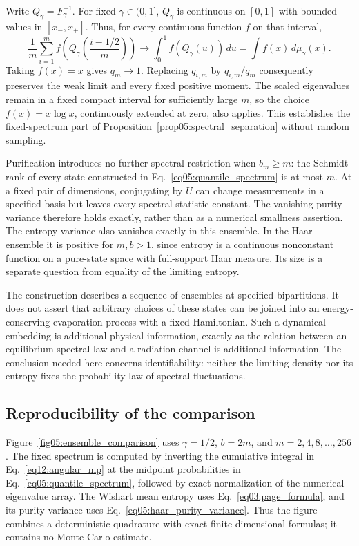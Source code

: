 \documentclass[11pt,letterpaper]{article}
\theoremstyle{plain}
\theoremstyle{definition}
\theoremstyle{remark}
\begin{document}
Write $Q_\gamma=F_\gamma^{-1}$.  For fixed $\gamma\in(0,1]$,
$Q_\gamma$ is continuous on $[0,1]$ with bounded values in
$[x_-,x_+]$.  Thus, for every continuous function $f$ on that interval,
\begin{equation}
\label{eq12:quantile_riemann}
 \frac1m\sum_{i=1}^m
 f\!\left(Q_\gamma\!\left(\frac{i-1/2}{m}\right)\right)
 \longrightarrow
 \int_0^1 f(Q_\gamma(u))\,du
 =\int f(x)\,d\mu_\gamma(x).
\end{equation}
Taking $f(x)=x$ gives $\bar q_m\to1$.  Replacing $q_{i,m}$ by
$q_{i,m}/\bar q_m$ consequently preserves the weak limit and every
fixed positive moment.  The scaled eigenvalues remain in a fixed
compact interval for sufficiently large $m$, so the choice
$f(x)=x\log x$, continuously extended at zero, also applies.  This
establishes the fixed-spectrum part of
Proposition~\ref{prop05:spectral_separation} without random sampling.

Purification introduces no further spectral restriction when $b_m\geq
m$: the Schmidt rank of every state constructed in
Eq.~\eqref{eq05:quantile_spectrum} is at most $m$.  At a fixed pair of
dimensions, conjugating by $U$ can change measurements in a specified
basis but leaves every spectral statistic constant.  The vanishing
purity variance therefore holds exactly, rather than as a numerical
smallness assertion.  The entropy variance also vanishes exactly in
this ensemble.  In the Haar ensemble it is positive for $m,b>1$,
since entropy is a continuous nonconstant function on a pure-state
space with full-support Haar measure.  Its size is a separate question
from equality of the limiting entropy.

The construction describes a sequence of ensembles at specified
bipartitions.  It does not assert that arbitrary choices of these states
can be joined into an energy-conserving evaporation process with a
fixed Hamiltonian.  Such a dynamical embedding is additional physical
information, exactly as the relation between an equilibrium spectral
law and a radiation channel is additional information.  The conclusion
needed here concerns identifiability: neither the limiting density nor
its entropy fixes the probability law of spectral fluctuations.

\subsection{Reproducibility of the comparison}
\label{subsec12:reproducibility}

Figure~\ref{fig05:ensemble_comparison} uses $\gamma=1/2$, $b=2m$,
and $m=2,4,8,\ldots,256$.  The fixed spectrum is computed by inverting
the cumulative integral in Eq.~\eqref{eq12:angular_mp} at the midpoint
probabilities in Eq.~\eqref{eq05:quantile_spectrum}, followed by exact
normalization of the numerical eigenvalue array.  The Wishart mean
entropy uses Eq.~\eqref{eq03:page_formula}, and its purity variance
uses Eq.~\eqref{eq05:haar_purity_variance}.  Thus the figure combines
a deterministic quadrature with exact finite-dimensional formulas;
it contains no Monte Carlo estimate.
\end{document}
